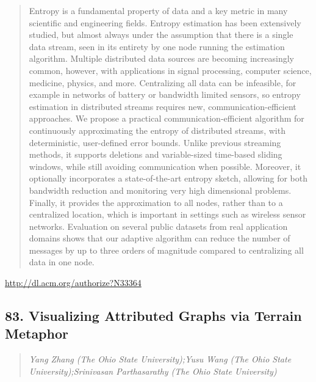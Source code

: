 \documentclass{article}
\begin{document}
\begin{quote}
Entropy is a fundamental property of data and a key metric in many scientific and engineering fields. Entropy estimation has been extensively studied, but almost always under the assumption that there is a single data stream, seen in its entirety by one node running the estimation algorithm. Multiple distributed data sources are becoming increasingly common, however, with applications in signal processing, computer science, medicine, physics, and more. Centralizing all data can be infeasible, for example in networks of battery or bandwidth limited sensors, so entropy estimation in distributed streams requires new, communication-efficient approaches. We propose a practical communication-efficient algorithm for continuously approximating the entropy of distributed streams, with deterministic, user-defined error bounds. Unlike previous streaming methods, it supports deletions and variable-sized time-based sliding windows, while still avoiding communication when possible. Moreover, it optionally incorporates a state-of-the-art entropy sketch, allowing for both bandwidth reduction and monitoring very high dimensional problems. Finally, it provides the approximation to all nodes, rather than to a centralized location, which is important in settings such as wireless sensor networks. Evaluation on several public datasets from real application domains shows that our adaptive algorithm can reduce the number of messages by up to three orders of magnitude compared to centralizing all data in one node.
\end{quote}

\href{http://dl.acm.org/authorize?N33364}{http://dl.acm.org/authorize?N33364}

\subsection{83. Visualizing Attributed Graphs via Terrain Metaphor}

\begin{quote}
\footnotesize{\textit{Yang Zhang (The Ohio State University);Yusu Wang (The Ohio State University);Srinivasan Parthasarathy (The Ohio State University)}}

\end{quote}
\end{document}
